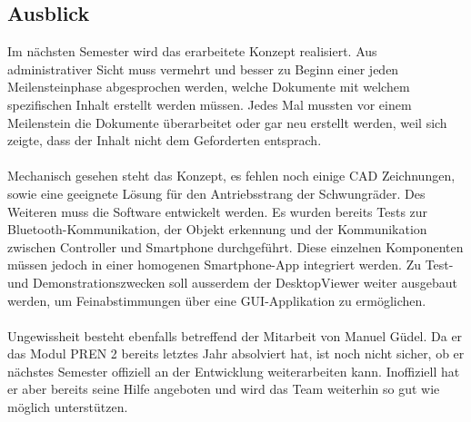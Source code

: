 \subsection{Ausblick}
Im nächsten Semester wird das erarbeitete Konzept realisiert. Aus administrativer Sicht muss vermehrt und besser zu Beginn einer jeden Meilensteinphase abgesprochen werden, welche Dokumente mit welchem spezifischen Inhalt erstellt werden müssen. Jedes Mal mussten vor einem Meilenstein die Dokumente überarbeitet oder gar neu erstellt werden, weil sich zeigte, dass der Inhalt nicht dem Geforderten entsprach.\\
\\
Mechanisch gesehen steht das Konzept, es fehlen noch einige CAD Zeichnungen, sowie eine geeignete Lösung für den Antriebsstrang der Schwungräder. Des Weiteren muss die Software entwickelt werden. Es wurden bereits Tests zur Bluetooth-Kommunikation, der Objekt erkennung und der Kommunikation zwischen Controller und Smartphone durchgeführt. Diese einzelnen Komponenten müssen jedoch in einer homogenen Smartphone-App integriert werden. Zu Test- und Demonstrationszwecken soll ausserdem der DesktopViewer weiter ausgebaut werden, um Feinabstimmungen über eine GUI-Applikation zu ermöglichen.\\
\\
Ungewissheit besteht ebenfalls betreffend der Mitarbeit von Manuel Güdel. Da er das Modul PREN 2 bereits letztes Jahr absolviert hat, ist noch nicht sicher, ob er nächstes Semester offiziell an der Entwicklung weiterarbeiten kann. Inoffiziell hat er aber bereits seine Hilfe angeboten und wird das Team weiterhin so gut wie möglich unterstützen.
